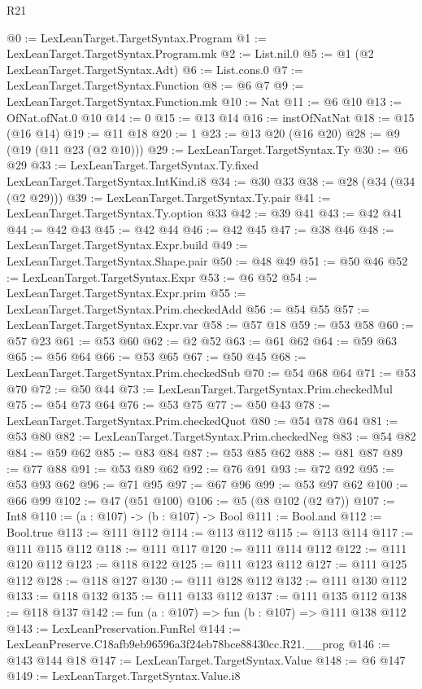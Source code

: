 \begin{lexlean}{R21}
\begin{coremodule}
@0 := LexLeanTarget.TargetSyntax.Program
@1 := LexLeanTarget.TargetSyntax.Program.mk
@2 := List.nil.{0}
@5 := @1 (@2 LexLeanTarget.TargetSyntax.Adt)
@6 := List.cons.{0}
@7 := LexLeanTarget.TargetSyntax.Function
@8 := @6 @7
@9 := LexLeanTarget.TargetSyntax.Function.mk
@10 := Nat
@11 := @6 @10
@13 := OfNat.ofNat.{0} @10
@14 := 0
@15 := @13 @14
@16 := instOfNatNat
@18 := @15 (@16 @14)
@19 := @11 @18
@20 := 1
@23 := @13 @20 (@16 @20)
@28 := @9 (@19 (@11 @23 (@2 @10)))
@29 := LexLeanTarget.TargetSyntax.Ty
@30 := @6 @29
@33 := LexLeanTarget.TargetSyntax.Ty.fixed LexLeanTarget.TargetSyntax.IntKind.i8
@34 := @30 @33
@38 := @28 (@34 (@34 (@2 @29)))
@39 := LexLeanTarget.TargetSyntax.Ty.pair
@41 := LexLeanTarget.TargetSyntax.Ty.option @33
@42 := @39 @41
@43 := @42 @41
@44 := @42 @43
@45 := @42 @44
@46 := @42 @45
@47 := @38 @46
@48 := LexLeanTarget.TargetSyntax.Expr.build
@49 := LexLeanTarget.TargetSyntax.Shape.pair
@50 := @48 @49
@51 := @50 @46
@52 := LexLeanTarget.TargetSyntax.Expr
@53 := @6 @52
@54 := LexLeanTarget.TargetSyntax.Expr.prim
@55 := LexLeanTarget.TargetSyntax.Prim.checkedAdd
@56 := @54 @55
@57 := LexLeanTarget.TargetSyntax.Expr.var
@58 := @57 @18
@59 := @53 @58
@60 := @57 @23
@61 := @53 @60
@62 := @2 @52
@63 := @61 @62
@64 := @59 @63
@65 := @56 @64
@66 := @53 @65
@67 := @50 @45
@68 := LexLeanTarget.TargetSyntax.Prim.checkedSub
@70 := @54 @68 @64
@71 := @53 @70
@72 := @50 @44
@73 := LexLeanTarget.TargetSyntax.Prim.checkedMul
@75 := @54 @73 @64
@76 := @53 @75
@77 := @50 @43
@78 := LexLeanTarget.TargetSyntax.Prim.checkedQuot
@80 := @54 @78 @64
@81 := @53 @80
@82 := LexLeanTarget.TargetSyntax.Prim.checkedNeg
@83 := @54 @82
@84 := @59 @62
@85 := @83 @84
@87 := @53 @85 @62
@88 := @81 @87
@89 := @77 @88
@91 := @53 @89 @62
@92 := @76 @91
@93 := @72 @92
@95 := @53 @93 @62
@96 := @71 @95
@97 := @67 @96
@99 := @53 @97 @62
@100 := @66 @99
@102 := @47 (@51 @100)
@106 := @5 (@8 @102 (@2 @7))
@107 := Int8
@110 := (a : @107) -> (b : @107) -> Bool
@111 := Bool.and
@112 := Bool.true
@113 := @111 @112
@114 := @113 @112
@115 := @113 @114
@117 := @111 @115 @112
@118 := @111 @117
@120 := @111 @114 @112
@122 := @111 @120 @112
@123 := @118 @122
@125 := @111 @123 @112
@127 := @111 @125 @112
@128 := @118 @127
@130 := @111 @128 @112
@132 := @111 @130 @112
@133 := @118 @132
@135 := @111 @133 @112
@137 := @111 @135 @112
@138 := @118 @137
@142 := fun (a : @107) => fun (b : @107) => @111 @138 @112
@143 := LexLeanPreservation.FunRel
@144 := LexLeanPreserve.C18afb9eb96596a3f24eb78bce88430cc.R21.__prog
@146 := @143 @144 @18
@147 := LexLeanTarget.TargetSyntax.Value
@148 := @6 @147
@149 := LexLeanTarget.TargetSyntax.Value.i8

\end{coremodule}
\end{lexlean}
